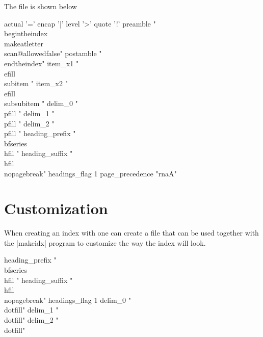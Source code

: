 The file  is shown below
\begin{teX}
actual '='
encap '|'
level '>'
quote '!'
preamble
"\n \\begin{theindex} \n \\makeatletter\\scan@allowedfalse\n"
postamble
"\n\n \\end{theindex}\n"
item_x1   "\\efill \n \\subitem "
item_x2   "\\efill \n \\subsubitem "
delim_0   "\\pfill "
delim_1   "\\pfill "
delim_2   "\\pfill "
heading_prefix   "{\\bfseries\\hfil "
heading_suffix   "\\hfil}\\nopagebreak\n"
headings_flag       1
page_precedence "rnaA"

\end{teX}


\section{Customization}

When creating an index with  one can create a  file that can be used together with the |makeidx| program to customize the way the index will look.

\begin{teX}
heading_prefix "{\\bfseries\\hfil "
heading_suffix "\\hfil}\\nopagebreak\n"
headings_flag 1
delim_0 "\\dotfill"
delim_1 "\\dotfill"
delim_2 "\\dotfill"
\end{teX}

